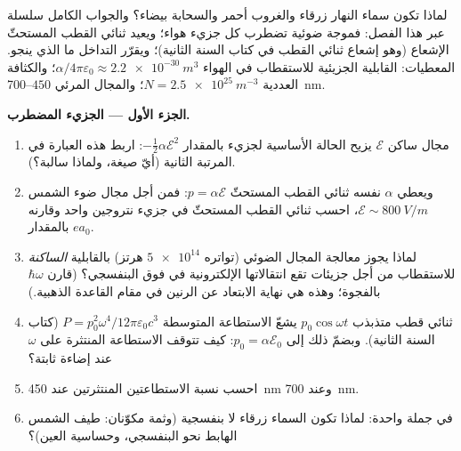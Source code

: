 \begin{problem}\label{pb:b3:perturbation-theory:1}
لماذا تكون سماء النهار زرقاء والغروب أحمر والسحابة بيضاء؟
والجواب الكامل سلسلة عبر هذا الفصل: فموجة ضوئية
تضطرب كل جزيء هواء؛ ويعيد ثنائي القطب المستحثّ الإشعاع (وهو
إشعاع ثنائي القطب في كتاب السنة الثانية)؛ ويقرّر التداخل
ما الذي ينجو. المعطيات: القابلية الجزيئية للاستقطاب في الهواء
$\alpha/4\pi\varepsilon_0 \approx \qty{2.2e-30}{m^3}$؛ والكثافة
العددية $N = \qty{2.5e25}{m^{-3}}$؛ والمجال المرئي
$450$--\qty{700}{nm}.

\medskip\noindent\textbf{الجزء الأول --- الجزيء المضطرب.}
\begin{enumerate}
  \item مجال ساكن $\mathcal E$ يزيح الحالة الأساسية لجزيء
        بالمقدار $-\tfrac12\alpha\mathcal E^2$: اربط هذه
        العبارة  في المرتبة الثانية (أيّ
        صيغة، ولماذا سالبة؟).
  \item ويعطي $\alpha$ نفسه ثنائي القطب المستحثّ $p =
        \alpha\mathcal E$: فمن أجل مجال ضوء الشمس $\mathcal E \sim
        \qty{800}{V/m}$، احسب ثنائي القطب المستحثّ في جزيء
        نتروجين واحد وقارنه بالمقدار $ea_0$.
  \item لماذا يجوز معالجة المجال الضوئي (تواتره $\num{5e14}$ هرتز)
        بالقابلية \emph{الساكنة} للاستقطاب من أجل
        جزيئات تقع انتقالاتها الإلكترونية في
        فوق البنفسجي؟ (قارن $\hbar\omega$ بالفجوة؛ وهذه هي
        نهاية الابتعاد عن الرنين في مقام القاعدة
        الذهبية.)
  \item ثنائي قطب متذبذب $p_0\cos\omega t$ يشعّ الاستطاعة
        المتوسطة $P = p_0^2\omega^4/12\pi\varepsilon_0c^3$
        (كتاب السنة الثانية). وبضمّ ذلك إلى $p_0 = \alpha\mathcal
        E_0$: كيف تتوقف الاستطاعة المنتثرة على $\omega$ عند
        إضاءة ثابتة؟
  \item احسب نسبة الاستطاعتين المنتثرتين عند \qty{450}{nm}
        وعند \qty{700}{nm}.
  \item في جملة واحدة: لماذا تكون السماء زرقاء لا بنفسجية
        (وثمة مكوّنان: طيف الشمس الهابط نحو
        البنفسجي، وحساسية العين)؟
\end{enumerate}


\end{problem}
